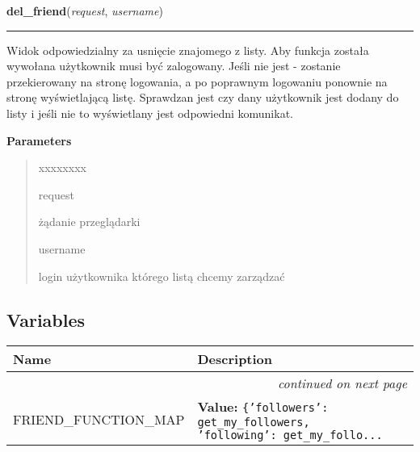 \hspace{.8\funcindent}\begin{boxedminipage}{\funcwidth}

    \raggedright \textbf{del\_friend}(\textit{request}, \textit{username})

    \vspace{-1.5ex}

    \rule{\textwidth}{0.5\fboxrule}
\setlength{\parskip}{2ex}
    Widok odpowiedzialny za usnięcie znajomego z listy. Aby funkcja została
    wywołana użytkownik musi być zalogowany. Jeśli nie jest - zostanie 
    przekierowany na stronę logowania, a po poprawnym logowaniu ponownie na
    stronę wyświetlającą listę. Sprawdzan jest czy dany użytkownik jest 
    dodany do listy i jeśli nie to wyświetlany jest odpowiedni komunikat.

\setlength{\parskip}{1ex}
      \textbf{Parameters}
      \vspace{-1ex}

      \begin{quote}
        \begin{Ventry}{xxxxxxxx}

          \item[request]

          żądanie przeglądarki

          \item[username]

          login użytkownika którego listą chcemy zarządzać

        \end{Ventry}

      \end{quote}

    \end{boxedminipage}



  \subsection{Variables}

    \vspace{-1cm}
\hspace{\varindent}\begin{longtable}{|p{\varnamewidth}|p{\vardescrwidth}|l}
\cline{1-2}
\cline{1-2} \centering \textbf{Name} & \centering \textbf{Description}& \\
\cline{1-2}
\endhead\cline{1-2}\multicolumn{3}{r}{\small\textit{continued on next page}}\\\endfoot\cline{1-2}
\endlastfoot\raggedright F\-R\-I\-E\-N\-D\-\_\-F\-U\-N\-C\-T\-I\-O\-N\-\_\-M\-A\-P\- & \raggedright \textbf{Value:} 
{\tt \{'followers': get\_my\_followers, 'following': get\_my\_follo\texttt{...}}&\\
\cline{1-2}
\end{longtable}

